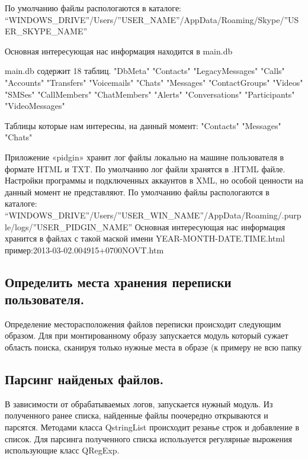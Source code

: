 По умолчанию файлы распологаются в каталоге: “WINDOWS_DRIVE”/Users/”USER_NAME”/AppData/Roaming/Skype/”USER_SKYPE_NAME”

Основная интересующая нас информация находится в main.db

main.db  содержит 18 таблиц. 
"DbMeta"   "Contacts"   "LegacyMessages"
"Calls"     "Accounts"   "Transfers"   
"Voicemails"   "Chats"      "Messages"   
"ContactGroups"   "Videos"   "SMSes"
"CallMembers"   "ChatMembers"   "Alerts"
"Conversations"     "Participants"   "VideoMessages"

Таблицы которые нам интересны, на данный момент:    
 "Contacts"    "Messages"    "Chats" 

Приложение «pidgin» хранит лог файлы локально на машине пользователя в формате HTML и TXT. По умолчанию лог файли хранятся в .HTML файле. Настройки программы и подключенных аккаунтов в XML, но особой ценности на данный момент не представляют.
По умолчанию файлы распологаются в каталоге: “WINDOWS_DRIVE”/Users/”USER_WIN_NAME”/AppData/Roaming/.purple/logs/”USER_PIDGIN_NAME”
Основная интересующая нас информация хранится в файлах с такой маской имени YEAR-MONTH-DATE.TIME.html пример:2013-03-02.004915+0700NOVT.htm

\subsection{Определить места хранения переписки пользователя.}

Определение месторасположения файлов переписки происходит следующим образом. Для при монтированному образу запускается модуль который сужает область поиска, сканируя только нужные места в образе (к примеру не всю папку %


\subsection{Парсинг найденых файлов.}

В зависимости от обрабатываемых логов, запускается нужный модуль. Из полученного ранее списка, найденные файлы поочередно открываются и парсятся. Методами класса QstringList происходит резанье строк и добавление в список. Для парсинга полученного списка используется регулярные вырожения использующие класс QRegExp. 

